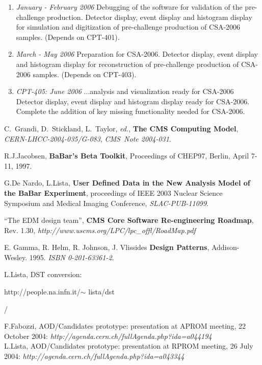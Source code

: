 \documentclass[draftmode]{memarticle}
\begin{document}
\begin{enumerate}
  \item {\em January - February 2006} Debugging of the software for
  validation of the pre-challenge production.
  Detector display, event display and histogram display for simulation
  and digitization of pre-challenge production of CSA-2006
  samples. (Depends on CPT-401).

  \item {\em March - May 2006} Preparation for CSA-2006.
  Detector display, event display and histogram display for
  reconstruction of pre-challenge production of CSA-2006
  samples. (Depends on CPT-403).

  \item {\em CPT-405: June 2006} ...analysis and visualization ready
  for CSA-2006
  Detector display, event display and histogram display ready for
  CSA-2006. Complete the addition of key missing functionality needed
  for CSA-2006.
 \end{enumerate}

\begin{thebibliography}{99}

 C.~Grandi, D.~Stickland, L.~Taylor, \textit{ed.},
\textbf{The CMS Computing Model}, {\em CERN-LHCC-2004-035/G-083}, {\em CMS~Note 2004-031}.

 R.J.Jacobsen, 
\textbf{BaBar's Beta Toolkit}, Proceedings of CHEP97, Berlin, April 7-11, 1997.

 G.De Nardo, L.Lista,
\textbf{User Defined Data in the New Analysis Model of the BaBar Experiment},
proceedings of IEEE 2003 Nuclear Science Symposium and Medical Imaging Conference,
{\em SLAC-PUB-11099}.

 ``The EDM design team'',
\textbf{CMS Core Software Re-engineering Roadmap}, Rev. 1.30,
{\em http://www.uscms.org/LPC/lpc\_offl/RoadMap.pdf}

 E. Gamma, R. Helm, R. Johnson, J. Vlissides
\textbf{Design Patterns}, Addison-Wesley. 1995. {\em ISBN 0-201-63361-2}.

 L.Lista, DST conversion:
{\em {}http://people.na.infn.it/$\sim$ lista/dst/}

 F.Fabozzi, AOD/Candidates prototype:
presentation at APROM meeting, 22 October 2004: 
{\em http://agenda.cern.ch/fullAgenda.php?ida=a044194}\\
L.Lista,  AOD/Candidates prototype:
presentation at RPROM meeting, 26 July 2004:
{\em http://agenda.cern.ch/fullAgenda.php?ida=a043344}

\end{thebibliography}

\end{document}
